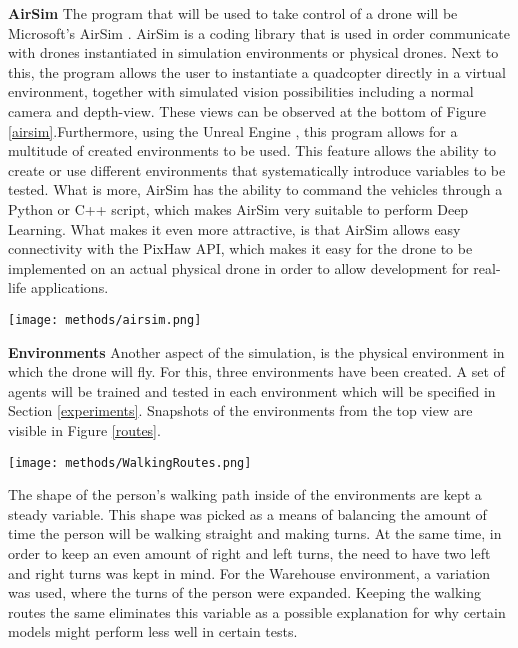 \noindent
\textbf{AirSim} \newline
The program that will be used to take control of a drone will be Microsoft's  
AirSim \cite{airsim}. AirSim is a coding library that is used in order 
communicate with drones instantiated in simulation environments or physical drones. 
Next 
to this, the program allows the user to instantiate a quadcopter directly in a 
virtual environment, together with simulated vision possibilities including a 
normal camera and depth-view. These views can be observed at the bottom of 
Figure \ref{airsim}.Furthermore, using the Unreal Engine \cite{unrealengine}, 
this program allows for a multitude of created environments to be used. This feature 
allows the ability to create or use different environments that systematically introduce 
variables to be tested.  What is more, AirSim has the ability to 
command the vehicles through a Python or C++ script, which makes AirSim very suitable 
to perform Deep Learning. What makes it even more attractive, is that AirSim allows 
easy connectivity with the PixHaw API, which makes it easy 
for the drone to be implemented on an actual physical drone in order to allow 
development for real-life applications. \newline

\begin{Figure}
    \centering
    \texttt{[image: methods/airsim.png]}
    \label{airsim}
\end{Figure} 


\noindent
\textbf{Environments} \newline
Another aspect of the simulation, is the physical environment in which the drone 
will fly. For this, three environments have been created. A set of agents will 
be trained and tested in each environment which will be specified in Section \ref{experiments}.
Snapshots of the environments from the top view are visible in Figure \ref{routes}.

\begin{Figure}
    \centering
    \texttt{[image: methods/WalkingRoutes.png]}
    \label{routes}
\end{Figure} 

The shape of the person's walking path inside of the environments are kept a steady 
variable. This shape was picked as a means of balancing the amount of time the person 
will be walking straight and making turns. At the same time, in order to keep an even amount of 
right and left turns, the need to have two left and right turns was kept in mind. For the 
Warehouse environment, a variation 
was used, where the turns of the person were expanded. 
Keeping the walking routes the same eliminates this variable as a possible explanation 
for why certain models might perform less well in certain tests. 

